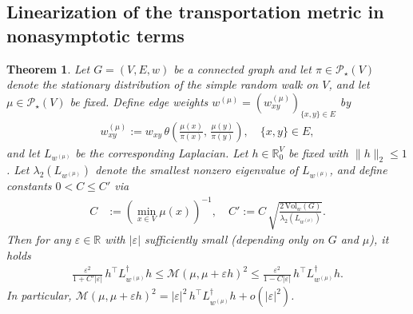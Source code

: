 \documentclass[11pt,a4paper]{article}
\newcommand{\Maas}{\mathcal{M}}
\newcommand{\Prob}{\mathscr{P}}
\newcommand{\Vol}{\mathrm{Vol}}
\newtheorem{theorem}{Theorem}[section]
\begin{document}
\subsection{Linearization of the transportation metric in nonasymptotic terms}\label{subsec:linearization-nonasymptotic}

\begin{theorem}\label{thm:linearization-mu}
    Let $G=(V,E, w)$ be a connected graph and let $\pi\in\Prob_\star (V)$ denote the stationary distribution of the simple random walk on $V$, and let $\mu\in\Prob_\star(V)$ be fixed. Define edge weights $w^{(\mu)}=(w^{(\mu)}_{xy})_{\{x,y\}\in E}$ by
        \begin{align*}
            w^{(\mu)}_{xy} := w_{xy}\,\theta\left(\frac{\mu(x)}{\pi(x)},\,\frac{\mu(y)}{\pi(y)}\right),\quad \{x,y\}\in E,
        \end{align*}
    and let $L_{w^{(\mu)}}$ be the corresponding Laplacian. Let $h\in\mathbb{R}^{V}_0$ be fixed with $\|h\|_2\le 1$. Let $\lambda_2(L_{w^{(\mu)}})$ denote the smallest nonzero eigenvalue of $L_{w^{(\mu)}}$, and define constants $0 < C \le C'$ via
        \begin{align}\label{eq:constants-linearization}
            C &:= \left(\min_{x\in V}\mu(x)\right)^{-1},\quad C' := C\,\sqrt{\frac{2\,\Vol_w(G)}{\lambda_2(L_{w^{(\mu)}})}}.
        \end{align}
    Then for any $\varepsilon\in\mathbb{R}$ with $|\varepsilon|$ sufficiently small (depending only on $G$ and $\mu$), it holds
        \begin{align}\label{eq:main-linearization}
            \frac{\varepsilon^2}{1 + C'|\varepsilon|}\, h^\top L_{w^{(\mu)}}^\dagger h
            \le \Maas(\mu,\mu+\varepsilon h)^2
            \le \frac{\varepsilon^2}{1 - C|\varepsilon|}\, h^\top L_{w^{(\mu)}}^\dagger h.
        \end{align}
    In particular, $\Maas(\mu,\mu+\varepsilon h)^2 = |\varepsilon|^2\, h^\top L_{w^{(\mu)}}^\dagger h  + o(|\varepsilon|^2)$.
\end{theorem}
\end{document}
